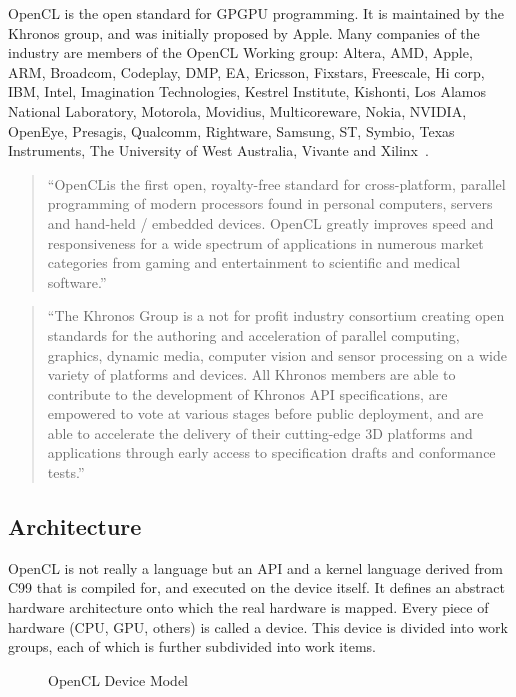 \Gls{OpenCL} is the open standard for \gls{GPGPU} programming. It is maintained by the Khronos group, and was initially proposed by Apple. Many companies of the industry are members of the \gls{OpenCL} Working group: Altera, AMD, Apple, ARM, Broadcom, Codeplay, DMP, EA, Ericsson, Fixstars, Freescale, Hi corp, IBM, Intel, Imagination Technologies, Kestrel Institute, Kishonti, Los Alamos National Laboratory, Motorola, Movidius, Multicoreware, Nokia, NVIDIA, OpenEye, Presagis, Qualcomm, Rightware, Samsung, ST, Symbio, Texas Instruments, The University of West Australia, Vivante and Xilinx~\cite{opencl}.
\begin{quotation}
``OpenCL\texttrademark is the first open, royalty-free standard for cross-platform, parallel programming of modern processors found in personal computers, servers and hand-held / embedded devices. \gls{OpenCL} greatly improves speed and responsiveness for a wide spectrum of applications in numerous market categories from gaming and entertainment to scientific and medical software.''~\cite{opencl}
\end{quotation}
\begin{quotation}
``The Khronos Group is a not for profit industry consortium creating open standards for the authoring and acceleration of parallel computing, graphics, dynamic media, computer vision and sensor processing on a wide variety of platforms and devices. All Khronos members are able to contribute to the development of Khronos \gls{API} specifications, are empowered to vote at various stages before public deployment, and are able to accelerate the delivery of their cutting-edge 3D platforms and applications through early access to specification drafts and conformance tests.''~\cite{khronos}
\end{quotation}

\subsection{Architecture}

\gls{OpenCL} is not really a language but an \gls{API} and a kernel language derived from C99 that is compiled for, and executed on the device itself. It defines an abstract hardware architecture onto which the real hardware is mapped. Every piece of hardware (\gls{CPU}, \gls{GPU}, others) is called a device. This device is divided into work groups, each of which is further subdivided into work items.

\begin{figure}[H]
\caption{OpenCL Device Model}
\centering
\end{figure}

